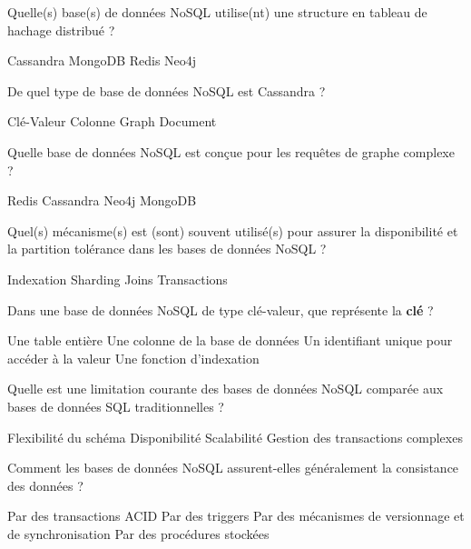 \documentclass[12pt,a4paper,addpoints,answers]{exam}
\begin{document}
\begin{questions}
		\question[1] Quelle(s) base(s) de données NoSQL utilise(nt) une structure en tableau de hachage distribué ?
		\begin{checkboxes}
			\choice Cassandra
			\choice MongoDB
			\CorrectChoice Redis
			\choice Neo4j
		\end{checkboxes}
		
		\question[\half] De quel type de base de données NoSQL est Cassandra ?
		\begin{checkboxes}
			\choice Clé-Valeur
			\CorrectChoice Colonne
			\choice Graph
			\choice Document
		\end{checkboxes}
		
		\question[\half] Quelle base de données NoSQL est conçue pour les requêtes de graphe complexe ?
		\begin{checkboxes}
			\choice Redis
			\choice Cassandra
			\CorrectChoice Neo4j
			\choice MongoDB
		\end{checkboxes}
		
		\question[1] Quel(s) mécanisme(s) est (sont) souvent utilisé(s) pour assurer la disponibilité et la partition tolérance dans les bases de données NoSQL ?
		\begin{checkboxes}
			\choice Indexation
			\CorrectChoice Sharding
			\choice Joins
			\choice Transactions
		\end{checkboxes}
		
		\question[1] Dans une base de données NoSQL de type clé-valeur, que représente la \textbf{clé} ?
		\begin{checkboxes}
			\choice Une table entière
			\choice Une colonne de la base de données
			\CorrectChoice Un identifiant unique pour accéder à la valeur
			\choice Une fonction d'indexation
		\end{checkboxes}
		
		\question[1] Quelle est une limitation courante des bases de données NoSQL comparée aux bases de données SQL traditionnelles ?
		\begin{checkboxes}
			\choice Flexibilité du schéma
			\choice Disponibilité
			\choice Scalabilité
			\CorrectChoice Gestion des transactions complexes
		\end{checkboxes}
		
		\question[1] Comment les bases de données NoSQL assurent-elles généralement la consistance des données ?
		\begin{checkboxes}
			\choice Par des transactions ACID
			\choice Par des triggers
			\CorrectChoice Par des mécanismes de versionnage et de synchronisation
			\choice Par des procédures stockées
		\end{checkboxes}
		

\end{questions}
\end{document}
